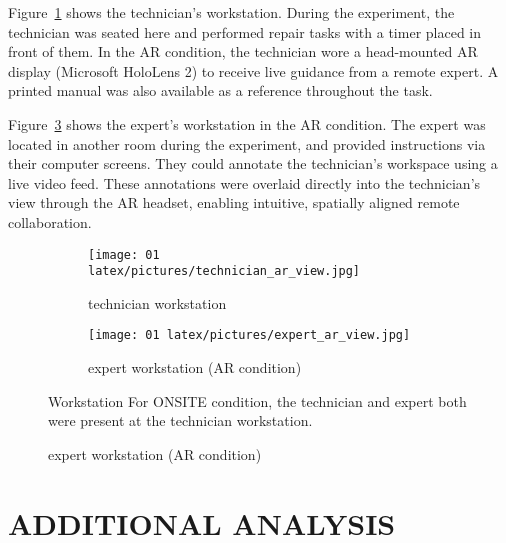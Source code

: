 \documentclass[msom,nonblindrev]{01 latex/class/informs3}
\begin{document}
\begin{APPENDICES}
Figure~\ref{fig:technician.workstation} shows the technician’s workstation. During the experiment, the technician was seated here and performed repair tasks with a timer placed in front of them. In the AR condition, the technician wore a head-mounted AR display (Microsoft HoloLens 2) to receive live guidance from a remote expert. A printed manual was also available as a reference throughout the task.

Figure~\ref{fig:expert.workstation} shows the expert’s workstation in the AR condition. The expert was located in another room during the experiment, and provided instructions via their computer screens. They could annotate the technician’s workspace using a live video feed. These annotations were overlaid directly into the technician’s view through the AR headset, enabling intuitive, spatially aligned remote collaboration.

\begin{figure}[htbp]
\FIGURE
{
 \begin{subfigure}[b]{0.4\textwidth}
  \texttt{[image: 01 latex/pictures/technician\_ar\_view.jpg]}
  \label{fig:technician.workstation}
      \caption{technician workstation}
 \end{subfigure}
 \hfill
 \begin{subfigure}[b]{0.4\textwidth}
  \centering
  \texttt{[image: 01 latex/pictures/expert\_ar\_view.jpg]}
  \label{fig:expert.workstation}
      \caption{expert workstation (AR condition)}
 \end{subfigure}
}
{Workstation}
{For ONSITE condition, the technician and expert both were present at the technician workstation.}
\end{figure}

\FloatBarrier
\newpage
\section{ADDITIONAL ANALYSIS}\label{app:add_analysis}


\end{APPENDICES}
\end{document}
